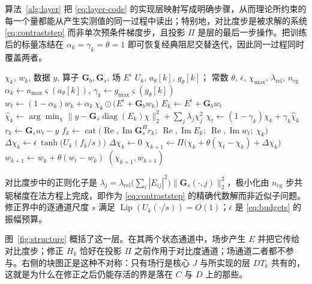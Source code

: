 \documentclass[UTF8,a4paper,11pt]{ctexart}
\newcommand{\norm}[1]{\lVert #1 \rVert}
\begin{document}
算法~\ref{alg:layer} 把 \eqref{eq:layer-code} 的实现层映射写成明确步骤，从而理论所约束的每一个量都能从产生实测值的同一过程中读出；特别地，对比度步是被求解的系统 \eqref{eq:contraststep} 而非单次预条件梯度步，且投影 $\Pi$ 是层的最后一步操作。把训练后的标量冻结在 $\alpha_k=\gamma_k=\theta=1$ 即可恢复经典阻尼交替迭代，因此同一过程同时覆盖两者。

\begin{algorithm}[t]
\caption{式 \eqref{eq:layer-code} 的一个展开层 $T_k$：物理核
$T^{\mathrm{phys}}_{\alpha_k,\gamma_k}$ 后接已学习修正 $H_k$。}
\label{alg:layer}
\begin{algorithmic}[1]
\Require $\chi_k$, $w_k$, 数据 $y$, 算子 $\mathbf{G}_b,\mathbf{G}_s$, 场 $E^i$
\Require $U_k$, $a_\theta[k]$, $g_\theta[k]$；
常数 $\theta$, $\bar\epsilon$, $\chi_{\max}$, $\lambda_{\mathrm{rel}}$, $n_{\mathrm{cg}}$
\State $\alpha_k\gets a_{\max}\varsigma(a_\theta[k])$,
       $\gamma_k\gets g_{\max}\varsigma(g_\theta[k])$
\State $w_t\gets(1-\alpha_k)w_k+\alpha_k\,\chi_k\odot\big(E^i+\mathbf{G}_b w_k\big)$
\State $E_k\gets E^i+\mathbf{G}_b w_t$
\State $\hat\chi_k\gets\arg\min_{\chi}\norm{y-\mathbf{G}_s\operatorname{diag}(E_k)\chi}_2^2+\sum_j\lambda_j\chi_j^2$
\State $\chi_t\gets(1-\gamma_k)\chi_k+\gamma_k\hat\chi_k$
  \State $r_k\gets\mathbf{G}_s w_t-y$
  \State $f_k\gets\operatorname{cat}\big(\operatorname{Re},\operatorname{Im}\mathbf{G}_s^{H}r_k;\
         \operatorname{Re},\operatorname{Im}E_k;\
         \operatorname{Re},\operatorname{Im}w_t;\
         \chi_k\big)$
  \State $\Delta\chi_k\gets \bar\epsilon\,\tanh\!\big(U_k(f_k/s)\big)$
         \Comment{已学习修正}
\Else
  \State $\Delta\chi_k\gets 0$
\EndIf
\State $\chi_{k+1}\gets \Pi\big(\chi_k+\theta(\chi_t-\chi_k)+\Delta\chi_k\big)$
\State $w_{k+1}\gets w_k+\theta(w_t-w_k)$
\State \Return $(\chi_{k+1},w_{k+1})$
\end{algorithmic}
\end{algorithm}
对比度步中的正则化子是
$\lambda_j=\lambda_{\mathrm{rel}}\big(\sum_i|E_{ij}|^2\big)\norm{\mathbf{G}_s(\cdot,j)}_2^2$，极小化由 $n_{\mathrm{cg}}$ 步共轭梯度在法方程上完成，即作为 \eqref{eq:contraststep} 的精确代数解而非近似子问题。修正界中的逐通道尺度 $s$ 满足
$\operatorname{Lip}(U_k(\cdot/s))=O(1)$；$\bar\epsilon$ 是 \eqref{eq:budgets} 的振幅预算。

图~\ref{fig:structure} 概括了这一层。在其两个状态通道中，场步产生 $E$ 并把它传给对比度步；修正 $H_k$ 恰好在投影 $\Pi$ 之前作用于对比度通道；场通道二者都不参与。右侧的块图正是这种不对称：只有场行是核心 $J$ 与所实现的层 $DT_k$ 共有的，这就是为什么在修正之后仍能存活的界是落在 $C$ 与 $D$ 上的那些。
\end{document}
